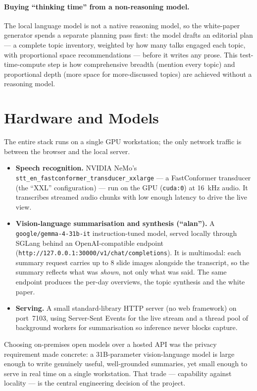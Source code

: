 \documentclass[11pt]{article}
\begin{document}
\paragraph{Buying ``thinking time'' from a non-reasoning model.}
The local language model is not a native reasoning model, so the white-paper
generator spends a separate planning pass first: the model drafts an editorial
plan --- a complete topic inventory, weighted by how many talks engaged each
topic, with proportional space recommendations --- before it writes any prose.
This test-time-compute step is how comprehensive breadth (mention every topic)
and proportional depth (more space for more-discussed topics) are achieved
without a reasoning model.

\section{Hardware and Models}
The entire stack runs on a single GPU workstation; the only network traffic is
between the browser and the local server.

\begin{itemize}[leftmargin=1.4em,itemsep=0.2em]
  \item \textbf{Speech recognition.} NVIDIA NeMo's
        \texttt{stt\_en\_fastconformer\_transducer\_xxlarge} --- a FastConformer transducer (the
        ``XXL'' configuration) --- run on the GPU (\texttt{cuda:0}) at
        16~kHz audio. It transcribes streamed audio chunks with low
        enough latency to drive the live view.
  \item \textbf{Vision-language summarisation and synthesis (``alan'').} A
        \texttt{google/gemma-4-31b-it} instruction-tuned model, served locally through
        SGLang behind an OpenAI-compatible endpoint (\texttt{http://127.0.0.1:30000/v1/chat/completions}). It is
        multimodal: each summary request carries up to 8 slide
        images alongside the transcript, so the summary reflects what was
        \emph{shown}, not only what was said. The same endpoint produces the
        per-day overviews, the topic synthesis and the white paper.
  \item \textbf{Serving.} A small standard-library HTTP server (no web framework)
        on port~7103, using Server-Sent Events for the live stream and a
        thread pool of background workers for summarisation so inference never
        blocks capture.
\end{itemize}

Choosing on-premises open models over a hosted API was the privacy requirement
made concrete: a 31B-parameter vision-language model is large enough to write
genuinely useful, well-grounded summaries, yet small enough to serve in real
time on a single workstation. That trade --- capability against locality --- is
the central engineering decision of the project.
\end{document}
